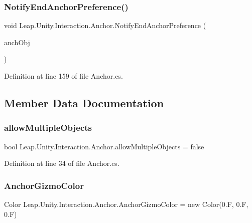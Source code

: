 \subsubsection{\texorpdfstring{NotifyEndAnchorPreference()}{NotifyEndAnchorPreference()}}
{\footnotesize\ttfamily void Leap.\+Unity.\+Interaction.\+Anchor.\+Notify\+End\+Anchor\+Preference (\begin{DoxyParamCaption}\item[{\mbox{\hyperlink{class_leap_1_1_unity_1_1_interaction_1_1_anchorable_behaviour}{Anchorable\+Behaviour}}}]{anch\+Obj }\end{DoxyParamCaption})}



Definition at line 159 of file Anchor.\+cs.



\subsection{Member Data Documentation}
\mbox{\label{class_leap_1_1_unity_1_1_interaction_1_1_anchor_ad0581637844a848f9e8948a48abfc77d}} 
\subsubsection{\texorpdfstring{allowMultipleObjects}{allowMultipleObjects}}
{\footnotesize\ttfamily bool Leap.\+Unity.\+Interaction.\+Anchor.\+allow\+Multiple\+Objects = false}



Definition at line 34 of file Anchor.\+cs.

\mbox{\label{class_leap_1_1_unity_1_1_interaction_1_1_anchor_a642b2c2841df3da969f01f30d6b4e528}} 
\subsubsection{\texorpdfstring{AnchorGizmoColor}{AnchorGizmoColor}}
{\footnotesize\ttfamily Color Leap.\+Unity.\+Interaction.\+Anchor.\+Anchor\+Gizmo\+Color = new Color(0.\+F, 0.\+F, 0.\+F)\hspace{0.3cm}{\ttfamily [static]}}



